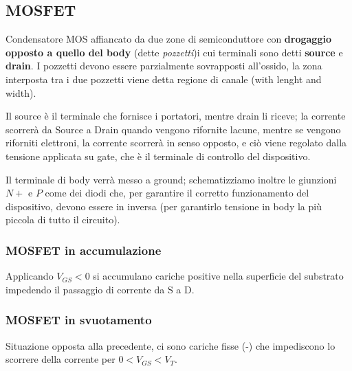 \documentclass[11pt,a4paper,]{article}
\begin{document}
\subsection{MOSFET}
Condensatore MOS affiancato da due zone di semiconduttore con \textbf{drogaggio opposto a quello del body} (dette \textit{pozzetti})i cui terminali sono detti \textbf{source} e \textbf{drain}.
I pozzetti devono essere parzialmente sovrapposti all'ossido, la zona interposta tra i due pozzetti viene detta regione di canale (with lenght and width).

Il source è il terminale che fornisce i portatori, mentre drain li riceve; la corrente scorrerà da Source a Drain quando vengono rifornite lacune, mentre se vengono riforniti elettroni, la corrente scorrerà in senso opposto, e ciò viene regolato dalla tensione applicata su gate, che è il terminale di controllo del dispositivo.

Il terminale di body verrà messo a ground; schematizziamo inoltre le giunzioni $N+$ e $P$ come dei diodi che, per garantire il corretto funzionamento del dispositivo, devono essere in inversa (per garantirlo tensione in body la più piccola di tutto il circuito).

\subsubsection{MOSFET in accumulazione}
Applicando $V_{GS}<0$ si accumulano cariche positive nella superficie del substrato impedendo il passaggio di corrente da S a D.
\subsubsection{MOSFET in svuotamento}
Situazione opposta alla precedente, ci sono cariche fisse (-) che impediscono lo scorrere della corrente per $0<V_{GS}<V_T$.
\end{document}
